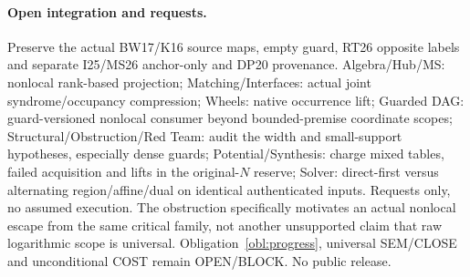 \documentclass[11pt]{article}
\begin{document}
\paragraph{Open integration and requests.}
Preserve the actual BW17/K16 source maps, empty guard, RT26 opposite labels and separate I25/MS26 anchor-only and DP20 provenance. Algebra/Hub/MS: nonlocal rank-based projection; Matching/Interfaces: actual joint syndrome/occupancy compression; Wheels: native occurrence lift; Guarded DAG: guard-versioned nonlocal consumer beyond bounded-premise coordinate scopes; Structural/Obstruction/Red Team: audit the width and small-support hypotheses, especially dense guards; Potential/Synthesis: charge mixed tables, failed acquisition and lifts in the original-$N$ reserve; Solver: direct-first versus alternating region/affine/dual on identical authenticated inputs. Requests only, no assumed execution. The obstruction specifically motivates an actual nonlocal escape from the same critical family, not another unsupported claim that raw logarithmic scope is universal. Obligation~\ref{obl:progress}, universal SEM/CLOSE and unconditional COST remain OPEN/BLOCK. No public release.
\end{document}
